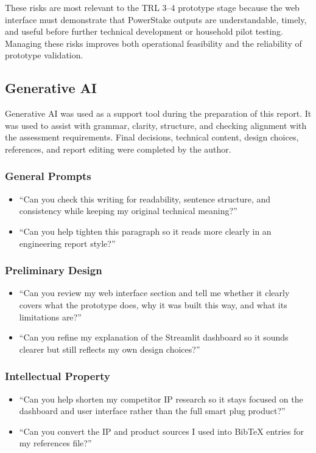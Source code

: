 \documentclass[11pt, twoside, a4paper]{article}
\begin{document}
These risks are most relevant to the TRL 3--4 prototype stage because the web interface must demonstrate that PowerStake outputs are understandable, 
timely, and useful before further technical development or household pilot testing. Managing these risks improves both operational feasibility and the
 reliability of prototype validation.

 \printbibliography



\subsection{Generative AI}

Generative AI was used as a support tool during the preparation of this report. It was used to assist with grammar, clarity, structure, and checking alignment with the assessment requirements. Final decisions, technical content, design choices, references, and report editing were completed by the author.
\subsubsection*{General Prompts}
\begin{itemize}
    \item ``Can you check this writing for readability, sentence structure, and consistency while keeping my original technical meaning?''
    \item ``Can you help tighten this paragraph so it reads more clearly in an engineering report style?''
\end{itemize}

\subsubsection*{Preliminary Design}
\begin{itemize}
    \item ``Can you review my web interface section and tell me whether it clearly covers what the prototype does, why it was built this way, and what its limitations are?''
    \item ``Can you refine my explanation of the Streamlit dashboard so it sounds clearer but still reflects my own design choices?''
\end{itemize}

\subsubsection*{Intellectual Property}
\begin{itemize}
    \item ``Can you help shorten my competitor IP research so it stays focused on the dashboard and user interface rather than the full smart plug product?''
    \item ``Can you convert the IP and product sources I used into BibTeX entries for my references file?''
\end{itemize}
\end{document}
